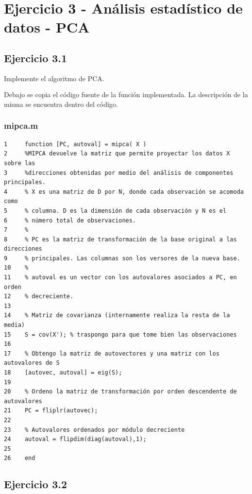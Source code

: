 \documentclass[11pt,a4paper,final]{article}
\begin{document}
\clearpage







\section{Ejercicio 3 - Análisis estadístico de datos - PCA}



\subsection{Ejercicio 3.1}


Implemente el algoritmo de PCA.


Debajo se copia el código fuente de la función implementada. La descripción de la misma se encuentra dentro del código.

\subsubsection*{mipca.m}

\begin{verbatim}
1     function [PC, autoval] = mipca( X )
2     %MIPCA devuelve la matriz que permite proyectar los datos X sobre las
3     %direcciones obtenidas por medio del análisis de componentes principales.
4     % X es una matriz de D por N, donde cada observación se acomoda como
5     % columna. D es la dimensión de cada observación y N es el
6     % número total de observaciones.
7     %
8     % PC es la matriz de transformación de la base original a las direcciones
9     % principales. Las columnas son los versores de la nueva base.
10    %
11    % autoval es un vector con los autovalores asociados a PC, en orden 
12    % decreciente.
13    
14    % Matriz de covarianza (internamente realiza la resta de la media)
15    S = cov(X'); % traspongo para que tome bien las observaciones
16    
17    % Obtengo la matriz de autovectores y una matriz con los autovalores de S
18    [autovec, autoval] = eig(S);
19    
20    % Ordeno la matriz de transformación por orden descendente de autovalores
21    PC = fliplr(autovec);
22    
23    % Autovalores ordenados por módulo decreciente
24    autoval = flipdim(diag(autoval),1);
25    
26    end
\end{verbatim}
    

\subsection{Ejercicio 3.2}
\end{document}
